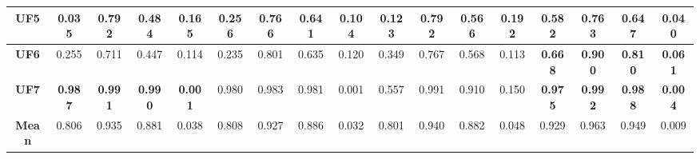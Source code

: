 \begin{table*}[t]
\begin{scriptsize}
\begin{tabular}{cc|c|c|c|c|c|c|c|c|c|c|c|c|c|c|c}
\multicolumn{1}{c|}{\textbf{UF5}}   & 0.035          & 0.792          & 0.484          & 0.165          & 0.256          & 0.766          & 0.641          & 0.104          & 0.123          & 0.792          & 0.566          & 0.192          & \textbf{0.582} & \textbf{0.763} & \textbf{0.647} & \textbf{0.040} \\ \hline
\multicolumn{1}{c|}{\textbf{UF6}}   & 0.255          & 0.711          & 0.447          & 0.114          & 0.235          & 0.801          & 0.635          & 0.120          & 0.349          & 0.767          & 0.568          & 0.113          & \textbf{0.668} & \textbf{0.900} & \textbf{0.810} & \textbf{0.061} \\ \hline
\multicolumn{1}{c|}{\textbf{UF7}}   & \textbf{0.987} & \textbf{0.991} & \textbf{0.990} & \textbf{0.001} & 0.980          & 0.983          & 0.981          & 0.001          & 0.557          & 0.991          & 0.910          & 0.150          & \textbf{0.975} & \textbf{0.992} & \textbf{0.988} & \textbf{0.004} \\ \hline
\multicolumn{1}{c|}{\textbf{Mean}}  & 0.806          & 0.935          & 0.881          & 0.038          & 0.808          & 0.927          & 0.886          & 0.032          & 0.801          & 0.940          & 0.882          & 0.048          & 0.929          & 0.963          & 0.949          & 0.009          \\ \hline
\end{tabular}%
\end{scriptsize}
\end{table*}



